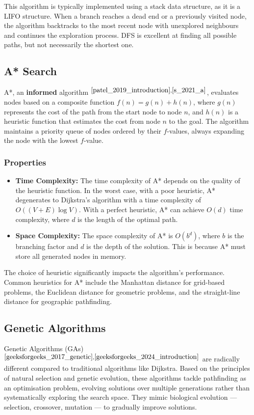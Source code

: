 This algorithm is typically implemented using a stack data structure, as it is a LIFO structure. When a branch reaches a dead end or a previously visited node, the algorithm backtracks to the most recent node with unexplored neighbours and continues the exploration process. DFS is excellent at finding all possible paths, but not necessarily the shortest one.

\subsection{A* Search}
A*, an \textbf{informed} algorithm $^{\cite{patel_2019_introduction}, \cite{s_2021_a}}$, evaluates nodes based on a composite function $ f(n) = g(n) + h(n) $, where $ g(n) $ represents the cost of the path from the start node to node $ n $, and $ h(n) $ is a heuristic function that estimates the cost from node $ n $ to the goal. The algorithm maintains a priority queue of nodes ordered by their $ f $-values, always expanding the node with the lowest $ f $-value.

\subsubsection{Properties}
\begin{itemize}    
    \item \textbf{Time Complexity:} The time complexity of A* depends on the quality of the heuristic function. In the worst case, with a poor heuristic, A* degenerates to Dijkstra's algorithm with a time complexity of $ O((V + E) \log V) $. With a perfect heuristic, A* can achieve $ O(d) $ time complexity, where $ d $ is the length of the optimal path.
    
    \item \textbf{Space Complexity:} The space complexity of A* is $ O(b^d) $, where $ b $ is the branching factor and $ d $ is the depth of the solution. This is because A* must store all generated nodes in memory.
\end{itemize}

The choice of heuristic significantly impacts the algorithm's performance. Common heuristics for A* include the Manhattan distance for grid-based problems, the Euclidean distance for geometric problems, and the straight-line distance for geographic pathfinding.

\subsection{Genetic Algorithms}
Genetic Algorithms (GAs)$^{\cite{geeksforgeeks_2017_genetic}, \cite{geeksforgeeks_2024_introduction}}$ are radically different compared to traditional algorithms like Dijkstra. Based on the principles of natural selection and genetic evolution, these algorithms tackle pathfinding as an optimisation problem, evolving solutions over multiple generations rather than systematically exploring the search space. They mimic biological evolution — selection, crossover, mutation — to gradually improve solutions.

